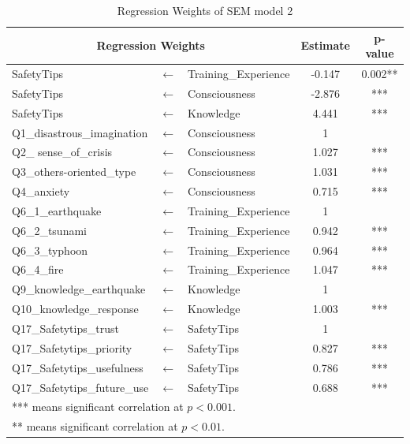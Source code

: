 \begin{table}[t]
  \caption{Regression Weights of SEM model 2 }
  \label{table11}
  \centering
  \begin{tabular}{lcl|c|c}
 \hline
 \multicolumn{3}{c|}{Regression Weights} & Estimate & p-value \\
 \hline
SafetyTips              &$\longleftarrow$ & Training\_Experience & -0.147 & 0.002**                \\
SafetyTips              &$\longleftarrow$ & Consciousness        & -2.876 & ***                  \\
SafetyTips              &$\longleftarrow$ & Knowledge            & 4.441  & ***                  \\
Q1\_disastrous\_imagination                      &$\longleftarrow$ & Consciousness        & 1      &  \\
Q2\_ sense\_of\_crisis                      &$\longleftarrow$ & Consciousness        & 1.027  & ***                  \\
Q3\_others-oriented\_type                      &$\longleftarrow$ & Consciousness        & 1.031  & ***                  \\
Q4\_anxiety                      &$\longleftarrow$ & Consciousness        & 0.715  & ***                  \\
Q6\_1\_earthquake       &$\longleftarrow$ & Training\_Experience & 1      &  \\
Q6\_2\_tsunami          &$\longleftarrow$ & Training\_Experience & 0.942  & ***                  \\
Q6\_3\_typhoon          &$\longleftarrow$ & Training\_Experience & 0.964  & ***                  \\
Q6\_4\_fire             &$\longleftarrow$ & Training\_Experience & 1.047  & ***                  \\
Q9\_knowledge\_earthquake                      &$\longleftarrow$ & Knowledge            & 1      &  \\
Q10\_knowledge\_response                     &$\longleftarrow$ & Knowledge            & 1.003  & ***                  \\
Q17\_Safetytips\_trust &$\longleftarrow$ & SafetyTips           & 1      &  \\
Q17\_Safetytips\_priority &$\longleftarrow$ & SafetyTips           & 0.827  & ***                  \\
Q17\_Safetytips\_usefulness &$\longleftarrow$ & SafetyTips           & 0.786  & ***                  \\
Q17\_Safetytips\_future\_use &$\longleftarrow$ & SafetyTips           & 0.688  & ***                 \\
 \hline
\multicolumn{5}{l}{*** means significant correlation at $p<0.001$.} \\
\multicolumn{5}{l}{** means significant correlation at $p<0.01$.}
  \end{tabular}
\end{table}


